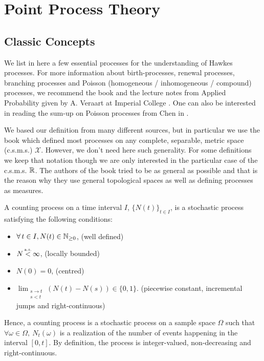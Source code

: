 \documentclass[11pt]{book}
\begin{document}
\section{Point Process Theory}
\subsection{Classic Concepts}
We list in here a few essential processes for the understanding of Hawkes processes. For more information about birth-processes, renewal processes, branching processes and Poisson (homogeneous / inhomogeneous / compound) processes, we recommend the book \cite{Grimmett} and the lecture notes from Applied Probability given by A. Veraart at Imperial College \cite{Veraart}. One can also be interested in reading the sum-up on Poisson processes from Chen in \cite{simulchen}.

We based our definition from many different sources, but in particular we use the book \cite{daley} which defined most processes on any complete, separable, metric space (c.s.m.s.) $\mathcal X$. However, we don't need here such generality. For some definitions we keep that notation though we are only interested in the particular case of the c.s.m.s. $\mathbb{R}$. The authors of the book \cite{daley} tried to be as general as possible and that is the reason why they use general topological spaces as well as defining processes as measures. 

\begin{definition}
A counting process on a time interval $I$, $\{N(t)\}_{t \in I}$, is a stochastic process satisfying the following conditions: 
\begin{itemize}
\item $ \forall t \in I, N(t) \in \N $, (well defined)
\item  $N  \stackrel{\mathclap{\mbox{\normalfont\tiny a.s.}}}{<} \infty$, (locally bounded)
\item $ N(0) = 0$, (centred)
\item $ \lim_{ \substack{ s \to t \\ s < t}  } \left ( N(t) - N(s) \right ) \in \{0,1\}$. (piecewise constant, incremental jumps and right-continuous)
\end{itemize}
\end{definition}

Hence, a counting process is a stochastic process on a sample space $\Omega$ such that $ \forall \omega \in \Omega, \ N_t( \omega ) $ is a realization of the number of events happening in the interval $ [ 0,t ]$. By definition, the process is integer-valued, non-decreasing and right-continuous. 
\end{document}
